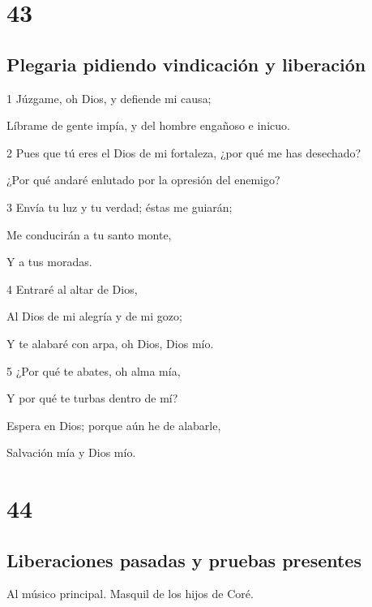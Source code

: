 \chapter{43}

\section*{Plegaria pidiendo vindicación y liberación}

\par 1 Júzgame, oh Dios, y defiende mi causa;
\par Líbrame de gente impía, y del hombre engañoso e inicuo.
\par 2 Pues que tú eres el Dios de mi fortaleza, ¿por qué me has desechado?
\par ¿Por qué andaré enlutado por la opresión del enemigo?
\par 3 Envía tu luz y tu verdad; éstas me guiarán;
\par Me conducirán a tu santo monte,
\par Y a tus moradas.
\par 4 Entraré al altar de Dios,
\par Al Dios de mi alegría y de mi gozo;
\par Y te alabaré con arpa, oh Dios, Dios mío.
\par 5 ¿Por qué te abates, oh alma mía,
\par Y por qué te turbas dentro de mí?
\par Espera en Dios; porque aún he de alabarle,
\par Salvación mía y Dios mío.

\chapter{44}

\section*{Liberaciones pasadas y pruebas presentes}

\par Al músico principal. Masquil de los hijos de Coré.

